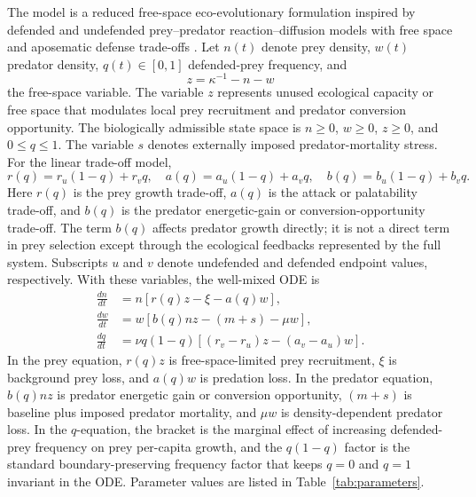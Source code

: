 \documentclass[11pt]{article}
\begin{document}
The model is a reduced free-space eco-evolutionary formulation inspired by defended and undefended prey--predator reaction--diffusion models with free space and aposematic defense trade-offs \citep{SasmalBanerjeeTakeuchi2019,RoyEtAl2026}. Let \(n(t)\) denote prey density, \(w(t)\) predator density, \(q(t)\in[0,1]\) defended-prey frequency, and
\[
z=\kappa^{-1}-n-w
\]
the free-space variable. The variable \(z\) represents unused ecological capacity or free space that modulates local prey recruitment and predator conversion opportunity. The biologically admissible state space is \(n\ge0\), \(w\ge0\), \(z\ge0\), and \(0\le q\le1\). The variable \(s\) denotes externally imposed predator-mortality stress. For the linear trade-off model,
\[
r(q)=r_u(1-q)+r_vq,
\quad
a(q)=a_u(1-q)+a_vq,
\quad
b(q)=b_u(1-q)+b_vq.
\]
Here \(r(q)\) is the prey growth trade-off, \(a(q)\) is the attack or palatability trade-off, and \(b(q)\) is the predator energetic-gain or conversion-opportunity trade-off. The term \(b(q)\) affects predator growth directly; it is not a direct term in prey selection except through the ecological feedbacks represented by the full system. Subscripts \(u\) and \(v\) denote undefended and defended endpoint values, respectively. With these variables, the well-mixed ODE is
\begin{align}
\frac{dn}{dt} &= n[r(q)z-\xi-a(q)w],\\
\frac{dw}{dt} &= w[b(q)nz-(m+s)-\mu w],\\
\frac{dq}{dt} &= \nu q(1-q)[(r_v-r_u)z-(a_v-a_u)w].
\end{align}
In the prey equation, \(r(q)z\) is free-space-limited prey recruitment, \(\xi\) is background prey loss, and \(a(q)w\) is predation loss. In the predator equation, \(b(q)nz\) is predator energetic gain or conversion opportunity, \((m+s)\) is baseline plus imposed predator mortality, and \(\mu w\) is density-dependent predator loss. In the \(q\)-equation, the bracket is the marginal effect of increasing defended-prey frequency on prey per-capita growth, and the \(q(1-q)\) factor is the standard boundary-preserving frequency factor that keeps \(q=0\) and \(q=1\) invariant in the ODE.
Parameter values are listed in Table~\ref{tab:parameters}.
\end{document}
